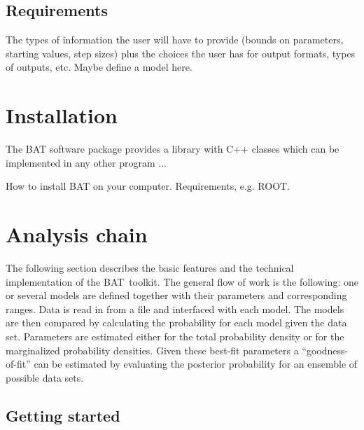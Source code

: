 \documentclass[11pt, a4paper]{article}
\newcommand{\BAT}{{\sc BAT}}
\begin{document}

\subsection{Requirements} 

The types of information the user will have to provide (bounds on
parameters, starting values, step sizes) plus the choices the user has
for output formats, types of outputs, etc.
Maybe define a model here. 


\section{Installation} 

The BAT software package provides a library with C++ classes which can
be implemented in any other program ...

How to install BAT on your computer. Requirements, e.g. ROOT.


\section{Analysis chain}

The following section describes the basic features and the technical
implementation of the \BAT\ toolkit. The general flow of work is the
following: one or several models are defined together with their
parameters and corresponding ranges. Data is read in from a file and
interfaced with each model. The models are then compared by
calculating the probability for each model given the data
set. Parameters are estimated either for the total probability density
or for the marginalized probability densities. Given these best-fit
parameters a ``goodness-of-fit'' can be estimated by evaluating the
posterior probability for an ensemble of possible data sets. 


\subsection{Getting started} 
\end{document}
